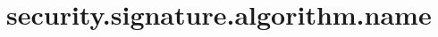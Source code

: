 \section{security.signature.algorithm.name}
\label{configuration:SecuritySignatureAlgorithmName}
\TODO
